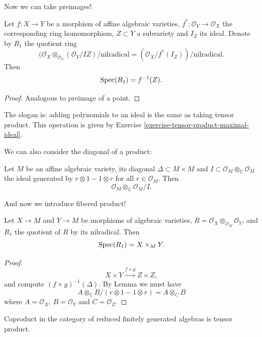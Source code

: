 \medskip\noindent
Now we can take preimages!

\begin{lemma}
\label{lemma-preimage-of-affine-subvariety}
Let $f:X \to Y$ be a morphism of affine
algebraic varieties,
$f^*:\mathcal{O}_Y \to \mathcal{O}_X$ the
corresponding ring homomorphism,
$Z \subset Y $ a subvariety and $I_Z$ its
ideal.
Denote by $R_1$ the quotient ring
$$
(\mathcal{O}_X
\otimes_{\mathcal{O}_Y}(\mathcal{O}_Y/IZ)/
\text{nilradical}
= (\mathcal{O}_X/f^*
(I_Z))/\text{nilradical}.
$$
Then
$$
\mathop{\mathrm{Spec}}(R_1)=f^{-1}(Z).
$$
\end{lemma}

\begin{proof}
Analogous to preimage of a point.
\end{proof}

\noindent
The slogan is:
adding polynomials to an ideal is the same as
taking tensor product.
This operation is given by Exercise
\ref{exercise-tensor-product-maximal-ideal}.

We can also consider the diagonal of a
product:

\begin{lemma}
\label{lemma-diagonal-of-product}
Let $M$ be an affine algebraic variety,
its diagonal $\Delta \subset M\times M$
and $I \subset \mathcal{O}_M
\otimes_\mathbb{C} \mathcal{O}_M$
the ideal generated by $r \otimes 1 - 1
\otimes r$
for all $r \in \mathcal{O}_M$. Then
$$
\mathcal{O}_M \otimes_\mathbb{C}
\mathcal{O}_M/I.
$$
\end{lemma}

\noindent
And now we introduce fibered product!

\begin{proposition}
\label{proposition-fibered-product}
Let $X \to M$ and $Y \to M$ be morphisms of
algebraic varieties,
$R= \mathcal{O}_X
\otimes_{\mathcal{O}_M}\mathcal{O}_Y$,
and $R_1$ the quotient of $R$ by its
nilradical.
Then
$$
\mathop{\mathrm{Spec}}(R_1)=X \times_M Y.
$$
\end{proposition}

\begin{proof}
$$
X\times Y \xrightarrow{f \times g} Z \times
Z,
$$
and compute $(f\times g)^{-1}(\Delta)$.
By Lemma \cite{lemma-diagonal} we must have
$$
A \otimes_\mathbb{C} B \big/(r \otimes 1-1
\otimes r)
=
A \otimes_C B
$$
where $A=\mathcal{O}_X$, $B=\mathcal{O}_Y$
and $C=\mathcal{O}_Z$.
\end{proof}

\begin{exercise}
\label{exercise-coproduct-in-rings}
Coproduct in the category of
reduced finitely generated algebras
is tensor product.
\end{exercise}

